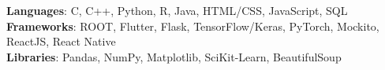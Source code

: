    \begin{itemize}[leftmargin=0.15in, label={}] 
    \small{\item{
      \textbf{Languages}: C, C++, Python, R, Java, HTML/CSS, JavaScript, SQL\\
      \textbf{Frameworks}: ROOT, Flutter, Flask, TensorFlow/Keras, PyTorch, Mockito, ReactJS, React Native\\
      \textbf{Libraries}: Pandas, NumPy, Matplotlib, SciKit-Learn, BeautifulSoup
       }}
\end{itemize}